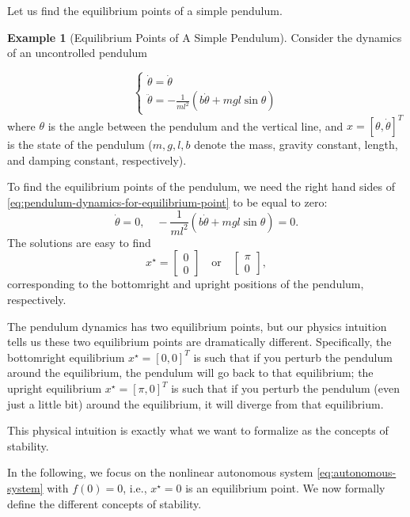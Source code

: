 \documentclass[
]{book}
\theoremstyle{definition}
\theoremstyle{definition}
\newtheorem{example}{Example}[chapter]
\theoremstyle{definition}
\theoremstyle{definition}
\theoremstyle{remark}
\begin{document}
Let us find the equilibrium points of a simple pendulum.

\begin{example}[Equilibrium Points of A Simple Pendulum]
\protect\hypertarget{exm:pendulumequilibriumpoint}{}\label{exm:pendulumequilibriumpoint}Consider the dynamics of an uncontrolled pendulum

\begin{equation}
\begin{cases}
\dot{\theta} = \dot{\theta} \\
\ddot{\theta} = - \frac{1}{ml^2} (b \dot{\theta} + mgl \sin \theta)
\end{cases}
\label{eq:pendulum-dynamics-for-equilibrium-point}
\end{equation}
where \(\theta\) is the angle between the pendulum and the vertical line, and \(x = [\theta,\dot{\theta}]^T\) is the state of the pendulum (\(m,g,l,b\) denote the mass, gravity constant, length, and damping constant, respectively).

To find the equilibrium points of the pendulum, we need the right hand sides of \eqref{eq:pendulum-dynamics-for-equilibrium-point} to be equal to zero:
\[
\dot{\theta} = 0, \quad - \frac{1}{ml^2} (b \dot{\theta} + mgl \sin \theta) = 0.
\]
The solutions are easy to find
\[
x^\star = \begin{bmatrix} 0 \\ 0 \end{bmatrix} \quad \text{or} \quad \begin{bmatrix} \pi \\ 0 \end{bmatrix},
\]
corresponding to the bottomright and upright positions of the pendulum, respectively.
\end{example}

The pendulum dynamics has two equilibrium points, but our physics intuition tells us these two equilibrium points are dramatically different. Specifically, the bottomright equilibrium \(x^\star = [0,0]^T\) is such that if you perturb the pendulum around the equilibrium, the pendulum will go back to that equilibrium; the upright equilibrium \(x^\star = [\pi,0]^T\) is such that if you perturb the pendulum (even just a little bit) around the equilibrium, it will diverge from that equilibrium.

This physical intuition is exactly what we want to formalize as the concepts of stability.

In the following, we focus on the nonlinear autonomous system \eqref{eq:autonomous-system} with \(f(0) = 0\), i.e., \(x^\star = 0\) is an equilibrium point. We now formally define the different concepts of stability.
\end{document}
